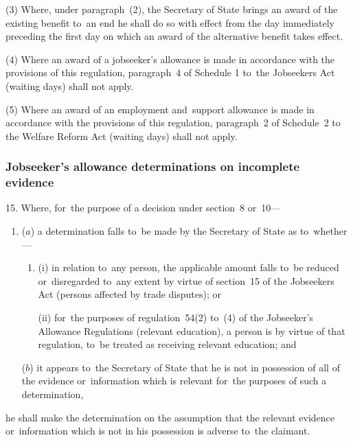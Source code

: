 \documentclass[12pt,a4paper]{article}
\begin{document}
(3) Where, under paragraph~(2), the Secretary of State brings an award of the existing benefit to~an end he shall do so with effect from the day immediately preceding the first day on which an award of the alternative benefit takes effect.

(4) Where an award of a jobseeker’s allowance is made in accordance with the provisions of this regulation, paragraph~4 of Schedule 1 to~the Jobseekers Act (waiting days) shall not apply.

(5) Where an award of an employment and~support allowance is made in accordance with the provisions of this regulation, paragraph~2 of Schedule~2 to the Welfare Reform Act (waiting days) shall not apply.


\subsubsection[15. Jobseeker’s allowance determinations on incomplete evidence]{Jobseeker’s allowance determinations on incomplete evidence}

15.  Where, for~the purpose of a decision under section~8 or~10—
\begin{enumerate}\item[]
($a$) a determination falls to~be made by the Secretary of State as to~whether—
\begin{enumerate}\item[]
(i) in relation to~any person, the applicable amount falls to~be reduced or~disregarded to~any extent by virtue of section~15 of the Jobseekers Act (persons affected by trade disputes); or

(ii) for~the purposes of regulation~54(2) to~(4) of the Jobseeker’s Allowance Regulations (relevant education), a person is by virtue of that regulation, to~be treated as receiving relevant education; and
\end{enumerate}

($b$) it appears to~the Secretary of State that he is not in possession of all of the evidence or~information which is relevant for~the purposes of such a determination,
\end{enumerate}
he shall make the determination on the assumption that the relevant evidence or~information which is not in his possession is adverse to~the claimant.
\end{document}
